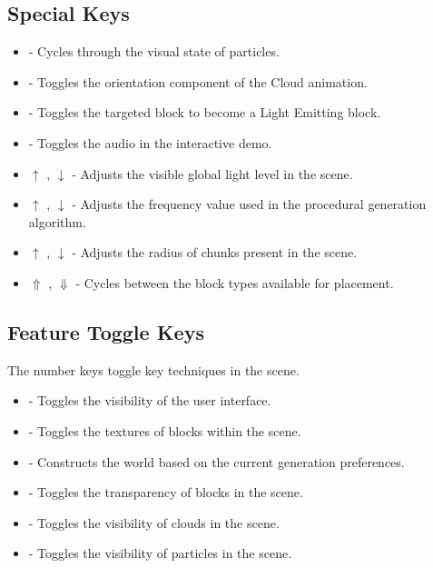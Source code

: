\documentclass[a4paper,11pt,titlepage]{scrartcl}
\begin{document}
\subsection{Special Keys}
\begin{itemize}
	\item {} - Cycles through the visual state of particles.
	\item {} - Toggles the orientation component of the Cloud animation.
	\item {} - Toggles the targeted block to become a Light Emitting block.
	\item {} - Toggles the audio in the interactive demo.
	\item $\uparrow$ , $\downarrow$  - Adjusts the visible global light level in the scene.
	\item $\uparrow$ , $\downarrow$  - Adjusts the frequency value used in the procedural generation algorithm.
	\item $\uparrow$ , $\downarrow$  - Adjusts the radius of chunks present in the scene.
	\item $\Uparrow$ , $\Downarrow$  - Cycles between the block types available for placement.
\end{itemize}
      
\subsection{Feature Toggle Keys}
The number keys toggle key techniques in the scene.
\begin{itemize}
	\item {} - Toggles the visibility of the user interface.
	\item {} - Toggles the textures of blocks within the scene.
	\item {} - Constructs the world based on the current generation preferences.
	\item {} - Toggles the transparency of blocks in the scene.
	\item {} - Toggles the visibility of clouds in the scene.
	\item {} - Toggles the visibility of particles in the scene.
\end{itemize}

\end{document}
